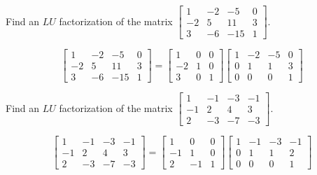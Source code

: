 \documentclass{ximera}
\begin{document}
\begin{problem}\label{prb:4.63} Find an $LU$ factorization of the matrix $\left[
\begin{array}{rrrr}
1 & -2 & -5 & 0 \\
-2 & 5 & 11 & 3 \\
3 & -6 & -15 & 1
\end{array}
\right] .$
\begin{hint}
\[
\left[
\begin{array}{rrrr}
1 & -2 & -5 & 0 \\
-2 & 5 & 11 & 3 \\
3 & -6 & -15 & 1
\end{array}
\right] = \left[
\begin{array}{rrr}
1 & 0 & 0 \\
-2 & 1 & 0 \\
3 & 0 & 1
\end{array}
\right] \left[
\begin{array}{rrrr}
1 & -2 & -5 & 0 \\
0 & 1 & 1 & 3 \\
0 & 0 & 0 & 1
\end{array}
\right]
\]
\end{hint}
\end{problem}

\begin{problem}\label{prb:4.64} Find an $LU$ factorization of the matrix $\left[
\begin{array}{rrrr}
1 & -1 & -3 & -1 \\
-1 & 2 & 4 & 3 \\
2 & -3 & -7 & -3
\end{array} \right] .$
\begin{hint}
\[
\left[
\begin{array}{rrrr}
1 & -1 & -3 & -1 \\
-1 & 2 & 4 & 3 \\
2 & -3 & -7 & -3
\end{array} \right] = \left[
\begin{array}{rrr}
1 & 0 & 0 \\
-1 & 1 & 0 \\
2 & -1 & 1
\end{array}
\right] \left[
\begin{array}{rrrr}
1 & -1 & -3 & -1 \\
0 & 1 & 1 & 2 \\
0 & 0 & 0 & 1
\end{array}
\right]
\]
\end{hint}
\end{problem}
\end{document}
